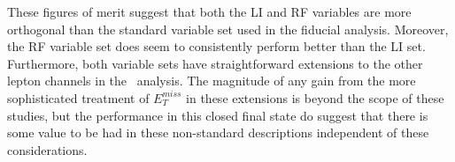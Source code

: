 \begin{comment}
A summary of performance metrics in this document may be found in Table \ref{tab:kahuna}.  


\begin{table}[!htbp]\captionsetup{justification=centering}
\begin{center}
\begin{tabular}{lccc}
\hline\hline
 & Standard &LI &RF\\
\hline
$\hat{\mu}$ & $1.75^{+0.24}_{-0.23}(\textrm{stat.})^{+0.34}_{-0.28}(\textrm{syst.})$ & $1.65^{+0.24}_{-0.23}(\textrm{stat.})^{+0.34}_{-0.28}(\textrm{syst.})$ & $1.50^{+0.24}_{-0.23}(\textrm{stat.})^{+0.34}_{-0.28}(\textrm{syst.})$\\
Asi. $\Delta err\left(\mu\right)$ &  --- & $<1$\%, +4.6\% & -6.5\%, -2.2\%\\
Obs. $\Delta err\left(\hat{\mu}\right)$ &  --- & -7.5\%, -3.7\% & -16\%, -8.8\%\\
\hline
Stat only sig. & 4.78 & 4.39 (-7.9\%) & 4.44 (-6.9\%)\\
Exp. (Asi.) sig. & 2.06 & 1.92 (-6.7\%) & 2.13 (+3.5\%)\\
Exp. (data) sig. & 1.76 & 1.73 (-1.7\%) & 1.80 (+3.4\%)\\
Obs. (data) sig. & 2.87 & 2.79 (-2.8\%) & 2.62 (-8.6\%)\\
\hline\hline
\end{tabular}
\end{center}
\caption{Summary of performance figures for the standard, LI, and RF variable sets.  In the case of the latter two, \% differences are given where relevant.  Differences in errors on $\mu$ are on full systematics and total error, respectively.}
\label{tab:kahuna}
\end{table}
\end{comment}

These figures of merit suggest that both the LI and RF variables are more orthogonal than the standard variable set used in the fiducial analysis.  Moreover, the RF variable set does seem to consistently perform better than the LI set.  Furthermore, both variable sets have straightforward extensions to the other lepton channels in the \vhbb\, analysis.  The magnitude of any gain from the more sophisticated treatment of $E_T^{miss}$ in these extensions is beyond the scope of these studies, but the performance in this closed final state do suggest that there is some value to be had in these non-standard descriptions independent of these considerations.

